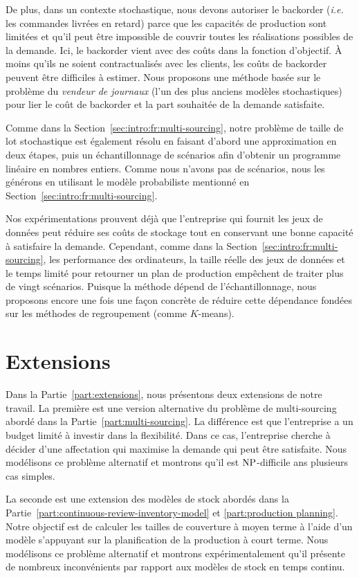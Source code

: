 De plus, dans un contexte stochastique, nous devons autoriser le backorder (\emph{i.e.} les commandes livrées en retard) parce que les capacités de production sont limitées et qu'il peut être impossible de couvrir toutes les réalisations possibles de la demande.
Ici, le backorder vient avec des coûts dans la fonction d'objectif.
\`A moins qu'ils ne soient contractualisés avec les clients, les coûts de backorder peuvent être difficiles à estimer.
Nous proposons une méthode basée sur le problème du \emph{vendeur de journaux} (l'un des plus anciens modèles stochastiques) pour lier le coût de backorder et la part souhaitée de la demande satisfaite.


Comme dans la Section~\ref{sec:intro:fr:multi-sourcing}, notre problème de taille de lot stochastique est également résolu en faisant d'abord une approximation en deux étapes, puis un échantillonnage de scénarios afin d'obtenir un programme linéaire en nombres entiers.
Comme nous n'avons pas de scénarios, nous les générons en utilisant le modèle probabiliste mentionné en Section~\ref{sec:intro:fr:multi-sourcing}.


\medskip


Nos expérimentations prouvent déjà que l'entreprise qui fournit les jeux de données peut réduire ses coûts de stockage tout en conservant une bonne capacité à satisfaire la demande.
Cependant, comme dans la Section~\ref{sec:intro:fr:multi-sourcing}, les performance des ordinateurs, la taille réelle des jeux de données et le temps limité pour retourner un plan de production empêchent de traiter plus de vingt scénarios.
Puisque la méthode dépend de l'échantillonnage, nous proposons encore une fois une façon concrète de réduire cette dépendance fondées sur les méthodes de regroupement (comme $K$-means).


\section{Extensions}


Dans la Partie~\ref{part:extensions}, nous présentons deux extensions de notre travail.
La première est une version alternative du problème de multi-sourcing abordé dans la Partie~\ref{part:multi-sourcing}.
La différence est que l'entreprise a un budget limité à investir dans la flexibilité.
Dans ce cas, l'entreprise cherche à décider d'une affectation qui maximise la demande qui peut être satisfaite.
Nous modélisons ce problème alternatif et montrons qu'il est $\operatorname{NP}$-difficile ans plusieurs cas simples.


La seconde est une extension des modèles de stock abordés dans la Partie~\ref{part:continuous-review-inventory-model} et \ref{part:production planning}.
Notre objectif est de calculer les tailles de couverture à moyen terme à l'aide d'un modèle s'appuyant sur la planification de la production à court terme.
Nous modélisons ce problème alternatif et montrons expérimentalement qu'il présente de nombreux inconvénients par rapport aux modèles de stock en temps continu.